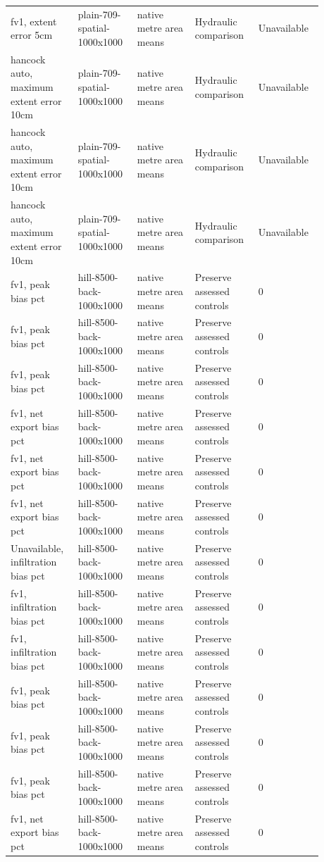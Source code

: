 \begin{longtable}{p{0.1760\linewidth}p{0.1760\linewidth}p{0.1760\linewidth}p{0.1760\linewidth}p{0.1760\linewidth}}
fv1, extent error 5cm & plain-709-spatial-1000x1000 & native metre area means & Hydraulic comparison & Unavailable \\
hancock auto, maximum extent error 10cm & plain-709-spatial-1000x1000 & native metre area means & Hydraulic comparison & Unavailable \\
hancock auto, maximum extent error 10cm & plain-709-spatial-1000x1000 & native metre area means & Hydraulic comparison & Unavailable \\
hancock auto, maximum extent error 10cm & plain-709-spatial-1000x1000 & native metre area means & Hydraulic comparison & Unavailable \\
fv1, peak bias pct & hill-8500-back-1000x1000 & native metre area means & Preserve assessed controls & 0 \\
fv1, peak bias pct & hill-8500-back-1000x1000 & native metre area means & Preserve assessed controls & 0 \\
fv1, peak bias pct & hill-8500-back-1000x1000 & native metre area means & Preserve assessed controls & 0 \\
fv1, net export bias pct & hill-8500-back-1000x1000 & native metre area means & Preserve assessed controls & 0 \\
fv1, net export bias pct & hill-8500-back-1000x1000 & native metre area means & Preserve assessed controls & 0 \\
fv1, net export bias pct & hill-8500-back-1000x1000 & native metre area means & Preserve assessed controls & 0 \\
Unavailable, infiltration bias pct & hill-8500-back-1000x1000 & native metre area means & Preserve assessed controls & 0 \\
fv1, infiltration bias pct & hill-8500-back-1000x1000 & native metre area means & Preserve assessed controls & 0 \\
fv1, infiltration bias pct & hill-8500-back-1000x1000 & native metre area means & Preserve assessed controls & 0 \\
fv1, peak bias pct & hill-8500-back-1000x1000 & native metre area means & Preserve assessed controls & 0 \\
fv1, peak bias pct & hill-8500-back-1000x1000 & native metre area means & Preserve assessed controls & 0 \\
fv1, peak bias pct & hill-8500-back-1000x1000 & native metre area means & Preserve assessed controls & 0 \\
fv1, net export bias pct & hill-8500-back-1000x1000 & native metre area means & Preserve assessed controls & 0 \\

\end{longtable}
